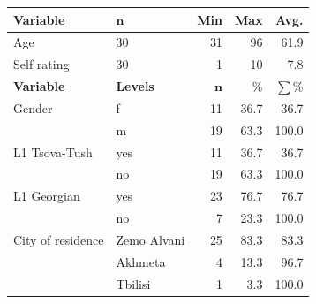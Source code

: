 \documentclass[portrait,fontscale=0.285,a0paper]{baposter2}
\begin{document}
\begin{poster}
{\begin{center}
{\footnotesize

  
\begin{tabular}{llrrr}
 \toprule
   \textbf{Variable} & $\mathbf{n}$ & \textbf{Min} & \textbf{Max} & \textbf{Avg.} \\ 
  \midrule
Age & 30 & 31 & 96 & 61.9 \\ 
  Self rating & 30 &  1 & 10 &  7.8 \\ \midrule
  
\textbf{Variable} & \textbf{Levels} & $\mathbf{n}$ & $\mathbf{\%}$ & $\mathbf{\sum \%}$ \\ 
  \midrule
Gender & f & 11 & 36.7 & 36.7 \\ 
   & m & 19 & 63.3 & 100.0 \\ 
L1 Tsova-Tush & yes & 11 & 36.7 & 36.7 \\ 
   & no & 19 & 63.3 & 100.0 \\ 
L1 Georgian & yes & 23 & 76.7 & 76.7 \\ 
   & no & 7 & 23.3 & 100.0 \\ 
City of residence & Zemo Alvani & 25 & 83.3 & 83.3 \\ 
   & Akhmeta & 4 & 13.3 & 96.7 \\ 
   & Tbilisi & 1 & 3.3 & 100.0 \\ 
\bottomrule
\end{tabular}

  }
  \end{center}




}





\end{poster}
\end{document}
